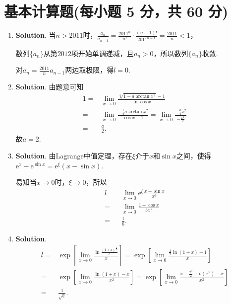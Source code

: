 \documentclass[../main.tex]{subfiles}
\begin{document}
\section{基本计算题(每小题 5 分，共 60 分)}
\begin{enumerate}
    \item \textbf{Solution}. 当$n>2011$时，$\frac{a_{n}}{a_{n-1}}=\frac{2011^{n}}{n!}
              \cdot\frac{(n-1)!}{2011^{n-1}}=\frac{2011}{n}<1$，

          数列$\{a_{n}\}$从第$2012$项开始单调递减，且$a_{n}>0$，所以数列$\{a_{n}\}$收敛.

          对$a_{n} = \frac{2011}{n}a_{n-1}$两边取极限，得$l=0$.

    \item \textbf{Solution}. 由题意可知
          \[
              \begin{aligned}
                  1 = {} & \lim_{x\to 0}\frac{\sqrt[4]{1-a\arctan x^2}-1}{\ln\cos x}                                                  \\
                  = {}   & \lim_{x\to0}\frac{-\frac{1}{4}a\arctan x^2}{\cos x-1}=\lim_{x\to 0}\frac{-\frac{a}{4} x^2}{-\frac{x^2}{2}} \\
                  = {}   & \frac{a}{2}.
              \end{aligned}
          \]
          故$a=2$.

    \item \textbf{Solution}. 由Lagrange中值定理，存在$\xi$介于$x$和$\sin x$之间，使得$\mathrm{e}
              ^{x}-\mathrm{e}^{\sin x}=\mathrm{e}^{\xi}(x-\sin x)$.

          易知当$x\to0$时，$\xi\to0$，所以
          \[
              \begin{aligned}
                  l= {} & \lim_{x\to0}\mathrm{e}^{\xi}\frac{x-\sin x}{x^3} \\
                  = {}  & \lim_{x\to0}\frac{1-\cos x}{3x^2}                \\
                  = {}  & \frac{1}{6}.
              \end{aligned}
          \]

    \item \textbf{Solution}.
          \[
              \begin{aligned}
                  l = {} & \exp\left[\lim_{x\to0}\frac{\ln\frac{(1+x)^{\frac{1}{x}}}{\mathrm{e}}}{x}\right]=\exp\left[\lim_{x\to0}\frac{\frac{1}{x}\ln(1+x)-1}{x}\right] \\
                  = {}   & \exp\left[\lim_{x\to0}\frac{\ln(1+x)-x}{x^2}\right]=\exp\left[\lim_{x\to0}\frac{x-\frac{x^2}{2}+o(x^2)-x}{x^2}\right]                         \\
                  = {}   & \frac{1}{\sqrt{\mathrm{e}}}.
              \end{aligned}
          \]


\end{enumerate}
\end{document}
